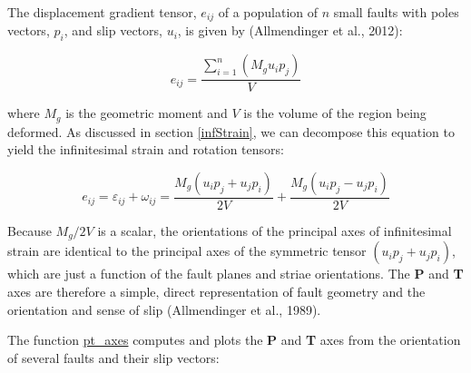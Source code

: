 \documentclass[a4paper , 12pt]{book}
\begin{document}
 The displacement gradient tensor, $e_{ij}$ of a population of $n$ small faults with poles vectors, $p_i$, and slip vectors, $u_i$, is given by (Allmendinger et al., 2012):

\begin{equation}
    e_{ij}=\frac{\sum_{i=1}^{n}\left(M_{g} u_{i} p_{j}\right)}{V}
\end{equation}

where $M_g$ is the geometric moment and $V$ is the volume of the region being deformed. As discussed in section \ref{infStrain}, we can decompose this equation to yield the infinitesimal strain and rotation tensors:

\begin{equation}
    e_{i j}=\varepsilon_{i j}+\omega_{i j}=\frac{M_{g}\left(u_{i} p_{j}+u_{j} p_{i}\right)}{2 V}+\frac{M_{g}\left(u_{i} p_{j}-u_{j} p_{i}\right)}{2 V}
\end{equation}

Because $M_g/2V$ is a scalar, the orientations of the principal axes of infinitesimal strain are identical to the principal axes of the symmetric tensor $(u_i p_j+u_j p_i)$, which are just a function of the fault planes and striae orientations. The \textbf{P} and \textbf{T} axes are therefore a simple, direct representation of fault geometry and the orientation and sense of slip (Allmendinger et al., 1989).

The function \href{https://github.com/nfcd/compGeo/blob/master/source/functions/pt_axes.py}{pt\_axes} computes and plots the \textbf{P} and \textbf{T} axes from the orientation of several faults and their slip vectors:
\end{document}
